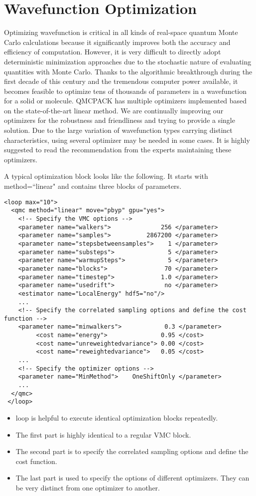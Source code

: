 \section{Wavefunction Optimization}
\label{sec:optimization}

Optimizing wavefunction is critical in all kinds of real-space quantum Monte Carlo calculations
because it significantly improves both the accuracy and efficiency of computation.
However, it is very difficult to directly adopt deterministic minimization approaches due to the stochastic nature of evaluating quantities with Monte Carlo.
Thanks to the algorithmic breakthrough during the first decade of this century and the tremendous computer power available, 
it becomes feasible to optimize tens of thousands of parameters in a wavefunction for a solid or molecule.
QMCPACK has multiple optimizers implemented based on the state-of-the-art linear method.
We are continually improving our optimizers for the robustness and friendliness and trying to provide a single solution.
Due to the large variation of wavefunction types carrying distinct characteristics, using several optimizer may be needed in some cases.
It is highly suggested to read the recommendation from the experts maintaining these optimizers.

A typical optimization block looks like the following. It starts with method=``linear" and contains three blocks of parameters.
\begin{lstlisting}[style=QMCPXML]
 <loop max="10">
  <qmc method="linear" move="pbyp" gpu="yes">
    <!-- Specify the VMC options -->
    <parameter name="walkers">              256 </parameter>
    <parameter name="samples">          2867200 </parameter>
    <parameter name="stepsbetweensamples">    1 </parameter>
    <parameter name="substeps">               5 </parameter>
    <parameter name="warmupSteps">            5 </parameter>
    <parameter name="blocks">                70 </parameter>
    <parameter name="timestep">             1.0 </parameter>
    <parameter name="usedrift">              no </parameter>
    <estimator name="LocalEnergy" hdf5="no"/>
    ...
    <!-- Specify the correlated sampling options and define the cost function -->
    <parameter name="minwalkers">            0.3 </parameter>
         <cost name="energy">               0.95 </cost>
         <cost name="unreweightedvariance"> 0.00 </cost>
         <cost name="reweightedvariance">   0.05 </cost>
    ...
    <!-- Specify the optimizer options -->
    <parameter name="MinMethod">    OneShiftOnly </parameter>
    ...
  </qmc>
 </loop>
\end{lstlisting}
\begin{itemize}
\item loop is helpful to execute identical optimization blocks repeatedly.
\item The first part is highly identical to a regular VMC block.
\item The second part is to specify the correlated sampling options and define the cost function.
\item The last part is used to specify the options of different optimizers. They can be very distinct from one optimizer to another.
\end{itemize}


